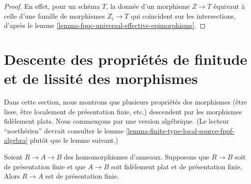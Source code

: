 \begin{proof}
En effet, pour un schéma $T$, la donnée d'un morphisme $Z \to T$ équivaut à
celle d'une famille de morphismes $Z_i \to T$ qui coïncident sur les
intersections, d'après le lemme
\ref{lemma-fpqc-universal-effective-epimorphisms}.
\end{proof}















\section{Descente des propriétés de finitude et de lissité des morphismes}
\label{section-descent-finiteness-morphisms}

\noindent
Dans cette section, nous montrons que plusieurs propriétés des morphismes
(être lisse, être localement de présentation finie, etc.) descendent par les
morphismes fidèlement plats. Nous commençons par une version algébrique.
(Le lecteur ``noethérien'' devrait consulter le lemme
\ref{lemma-finite-type-local-source-fppf-algebra} plutôt que le lemme suivant.)

\begin{lemma}
\label{lemma-flat-finitely-presented-permanence-algebra}
Soient $R \to A \to B$ des homomorphismes d'anneaux.
Supposons que $R \to B$ soit de présentation finie et que $A \to B$ soit
fidèlement plat et de présentation finie. Alors $R \to A$ est de présentation
finie.
\end{lemma}

